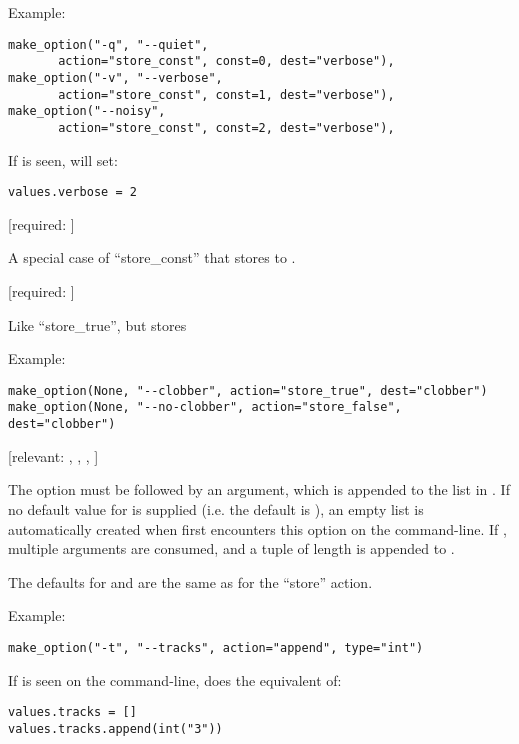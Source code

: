 \begin{definitions}
Example:

\begin{verbatim}
make_option("-q", "--quiet",
       action="store_const", const=0, dest="verbose"),
make_option("-v", "--verbose",
       action="store_const", const=1, dest="verbose"),
make_option("--noisy",
       action="store_const", const=2, dest="verbose"),
\end{verbatim}

If  is seen,  will set:

\begin{verbatim}
values.verbose = 2
\end{verbatim}

 [required: ]

A special case of ``store_const'' that stores  to .

 [required: ]

Like ``store_true'', but stores 

Example:

\begin{verbatim}
make_option(None, "--clobber", action="store_true", dest="clobber")
make_option(None, "--no-clobber", action="store_false", dest="clobber")
\end{verbatim}

 [relevant: , , , ]

The option must be followed by an argument, which is appended to the
list in . If no default value for  is supplied
(i.e. the default is ), an empty list is automatically created when
 first encounters this option on the command-line.
If , multiple arguments are consumed, and a tuple of
length  is appended to .

The defaults for  and  are the same as for the
``store'' action.

Example:

\begin{verbatim}
make_option("-t", "--tracks", action="append", type="int")
\end{verbatim}

If  is seen on the command-line,  does the equivalent of:

\begin{verbatim}
values.tracks = []
values.tracks.append(int("3"))
\end{verbatim}


\end{definitions}
